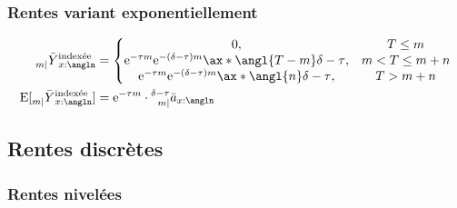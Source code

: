 \documentclass[10pt, french]{article}
\newcommand\cumlaut[2][black]{\stackon[.33ex]{#2}{\textcolor{#1}{\kern-.04ex.\kern-.2ex.}}}
\begin{document}
\begin{multicols*}{3}
\subsubsection*{\textcolor{amber(sae/ece)}{Rentes variant exponentiellement}}
\begin{align*}
	\prescript{}{m |}{\bar{Y}}^{\text{indexée}}_{x:\angln}
	&=	
	\left\{
	\begin{matrix}
		0,	&	T \le m \\
		\e{-\tau m} \e{-(\delta - \tau)m} \ax*{\angl{T - m}\delta - \tau},	&	m < T \le m + n \\
		\e{-\tau m} \e{-(\delta - \tau)m} \ax*{\angl{n}\delta - \tau},	&	T > m + n
	\end{matrix}
	\right.	\\
	\text{E}[\prescript{}{m |}{\bar{Y}}^{\text{indexée}}_{x:\angln}]
	&=	\e{-\tau m} \cdot \prescript{\delta - \tau}{m|}{\bar{a}}_{x:\angln}
\end{align*}



\columnbreak
\subsection{Rentes discrètes}
\subsubsection*{\textcolor{amber(sae/ece)}{Rentes nivelées}}


\end{multicols*}
\end{document}
